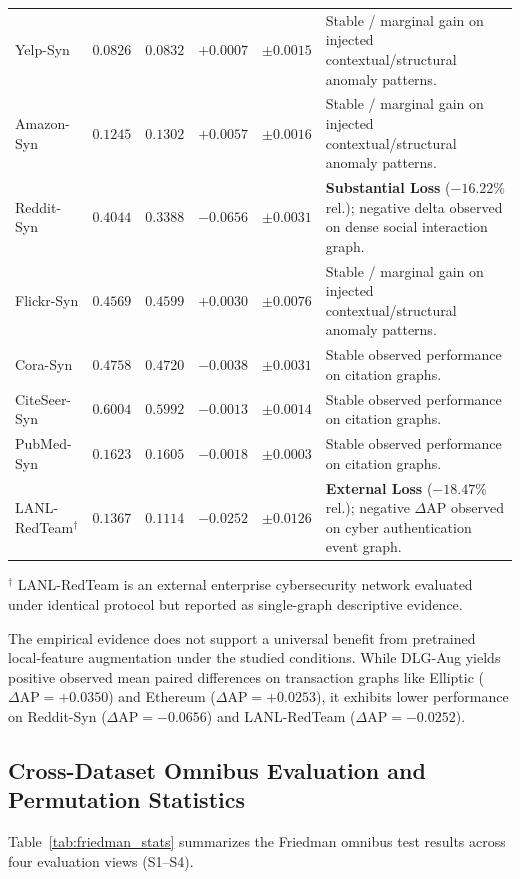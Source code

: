\documentclass[applsci,article,submit,moreauthors,pdftex]{Definitions/mdpi}
\begin{document}
\begin{table}[htbp]
\begin{tabularx}{\textwidth}{lrrrr>{\raggedright\arraybackslash}X}
Yelp-Syn & $0.0826$ & $0.0832$ & $+0.0007$ & $\pm 0.0015$ & Stable / marginal gain on injected contextual/structural anomaly patterns. \\
Amazon-Syn & $0.1245$ & $0.1302$ & $+0.0057$ & $\pm 0.0016$ & Stable / marginal gain on injected contextual/structural anomaly patterns. \\
Reddit-Syn & $0.4044$ & $0.3388$ & $\mathbf{-0.0656}$ & $\pm 0.0031$ & \textbf{Substantial Loss} ($-16.22\%$ rel.); negative delta observed on dense social interaction graph. \\
Flickr-Syn & $0.4569$ & $0.4599$ & $+0.0030$ & $\pm 0.0076$ & Stable / marginal gain on injected contextual/structural anomaly patterns. \\
Cora-Syn & $0.4758$ & $0.4720$ & $-0.0038$ & $\pm 0.0031$ & Stable observed performance on citation graphs. \\
CiteSeer-Syn & $0.6004$ & $0.5992$ & $-0.0013$ & $\pm 0.0014$ & Stable observed performance on citation graphs. \\
PubMed-Syn & $0.1623$ & $0.1605$ & $-0.0018$ & $\pm 0.0003$ & Stable observed performance on citation graphs. \\
LANL-RedTeam$^{\dagger}$ & $0.1367$ & $0.1114$ & $-0.0252$ & $\pm 0.0126$ & \textbf{External Loss} ($-18.47\%$ rel.); negative $\Delta\mathrm{AP}$ observed on cyber authentication event graph. \\
\bottomrule
\end{tabularx}
\begin{tablenotes}\footnotesize
\item $^{\dagger}$ LANL-RedTeam is an external enterprise cybersecurity network evaluated under identical protocol but reported as single-graph descriptive evidence.
\end{tablenotes}
\end{table}


The empirical evidence does not support a universal benefit from pretrained local-feature augmentation under the studied conditions. While DLG-Aug yields positive observed mean paired differences on transaction graphs like Elliptic ($\Delta\mathrm{AP} = +0.0350$) and Ethereum ($\Delta\mathrm{AP} = +0.0253$), it exhibits lower performance on Reddit-Syn ($\Delta\mathrm{AP} = -0.0656$) and LANL-RedTeam ($\Delta\mathrm{AP} = -0.0252$).

\subsection{Cross-Dataset Omnibus Evaluation and Permutation Statistics}
Table~\ref{tab:friedman_stats} summarizes the Friedman omnibus test results across four evaluation views (S1--S4).
\end{document}
